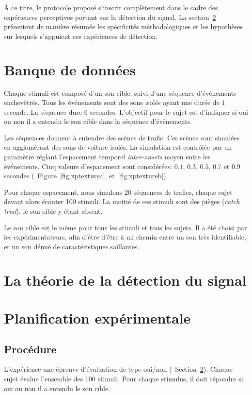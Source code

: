 À ce titre, le protocole proposé s'inscrit complètement dans le cadre des expériences perceptives portant sur la détection du signal. La section~\ref{app:sdt} présentent de manière résumée les spécificités méthodologiques et les hypothèses sur lesquels s'appuient ces expériences de détection.

\section{Banque de données}

Chaque stimuli est composé d'un son cible, suivi d'une séquence d'événements enchevêtrés. Tous les événements sont des sons isolés ayant une durée de $1$ seconde. La séquence dure 6 secondes. L'objectif pour le sujet est d'indiquer si oui ou non il a entendu le son cible dans la séquence d’événements. 

Les séquences donnent à entendre des scènes de trafic. Ces scènes sont simulées en agglomérant des sons de voiture isolés. La simulation est contrôlée par un paramètre réglant l'espacement temporel \emph{inter-onsets} moyen entre les événements. Cinq valeurs d'espacement sont considérées: $0.1$, $0.3$, $0.5$, $0.7$ et $0.9$ secondes (\cf~Figure~\ref{fig:xptexturea}, et~\ref{fig:xptextureb}). 

Pour chaque espacement, nous simulons 20 séquences de trafics, chaque sujet devant alors écouter 100 stimuli. La moitié de ces stimuli sont des pièges (\emph{catch trial}), le son cible y étant absent.

Le son cible est le même pour tous les stimuli et tous les sujets. Il a été choisi par les expérimentateurs, afin d'être d'être à mi chemin entre un son très identifiable, et un son dénué de caractéristiques saillantes.

\section{La théorie de la détection du signal}
\label{app:sdt}

\section{Planification expérimentale}

\subsection{Procédure}

L'expérience une épreuve d'évaluation de type oui/non (\cf~Section~\ref{app:sdt}). Chaque sujet évalue l'ensemble des 100 stimuli. Pour chaque stimulus, il doit répondre si oui ou non il a entendu le son cible.

